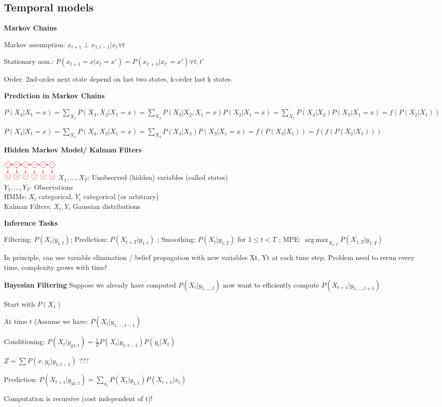 \documentclass[a4paper, 11pt, landscape]{article}
\DeclareMathOperator*{\argmax}{arg\,max}
\begin{document}
\begin{multicols*}{3}
\subsection{Temporal models}

\textbf{Markov Chains}

Markov assumption: $x_{t+1} \perp x_{1:t-1} | x_t \forall t$

Stationary asm.: $P(x_{t+1} = x | x_t = x') = P(x_{t'+1} | x_{t'} = x') \forall t, t'$

Order: 2nd-order next state depend on last two states, k-order last k states. 

\textbf{Prediction in Markov Chains}

$P(X_3 | X_1 = x) = \sum_{X_2}P(X_3,X_2|X_1 = x) = \sum_{X_2}P(X_3 | X_2, X_1 = x)P(X_2 | X_1 = x) =  \sum_{X_2}P(X_3 | X_2)P(X_2 | X_1 = x) = f(P(X_2|X_1))$

$P(X_4 | X_1 = x) = \sum_{X_3}P(X_4,X_3|X_1 = x) = \sum_{X_3}P(X_4 | X_3)P(X_3 | X_1 = x) = f(P(X_3|X_1)) = f(f(P(X_2 | X_1)))$

\textbf{Hidden Markov Model/ Kalman Filters}

\includegraphics[height=1cm]{img/pai4.png}
$X_1,...,X_T$: Unobserved (hidden) variables (called states) \\
$Y_1,...,Y_T$: Observations \\
HMMs: $X_i$ categorical, $Y_i$ categorical (or arbitrary)\\
Kalman Filters: $X_i, Y_i$ Gaussian distributions

\textbf{Inference Tasks}

Filtering: $P(X_t | y_{1:t} ) $; Prediction: $P(X_{t+T} | y_{1:t} )$ ; Smoothing: $P(X_t | y_{1:T}) \text{ for } 1\leq t < T$ ; MPE: $\argmax_{X_{1:T}} P(X_{1:T} | y_{1:T})$
 
In principle, can use variable elimination / belief propagation with new variables Xt, Yt at
each time step. Problem need to rerun every time, complexity grows with time!

\textbf{Bayesian Filtering}
Suppose we already have computed $P(X_t | y_{1,...,t})$ now want to efficiently compute $P(X_{t+1} | y_{1,...,t+1})$

\begin{compactitem}
	\item Start with $P(X_1)$
	\item At time $t$ (Assume we have:  $P(X_t | y_{1,...,t-1})$
	\item Conditioning: $P(X_t | y_{y1:t}) = \frac{1}{Z} P(X_t | y_{1:t-1})P(y_t | X_t)$
	\item $Z= \sum P(x,y_t | y_{1:t-1})$ ???
	\item Prediction: $P(X_{t+1} | y_{y1:t}) = \sum_{x_t}  P(X_t | y_{1:t}) P(X_{t+1} | x_t)$
\end{compactitem}
Computation is recursive (cost independent of t)!



\end{multicols*}
\end{document}
